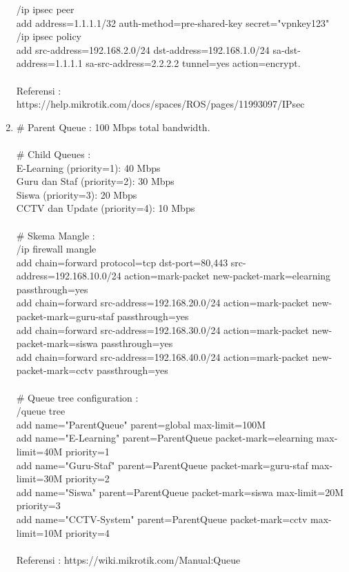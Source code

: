 \begin{enumerate}
	/ip ipsec peer \\
	add address=1.1.1.1/32 auth-method=pre-shared-key secret="vpnkey123" \\
	/ip ipsec policy \\
	add src-address=192.168.2.0/24 dst-address=192.168.1.0/24 sa-dst-address=1.1.1.1 sa-src-address=2.2.2.2 tunnel=yes action=encrypt. \\ \\
	Referensi : https://help.mikrotik.com/docs/spaces/ROS/pages/11993097/IPsec 
	\item \# Parent Queue : 100 Mbps total bandwidth.\\ \\
	\# Child Queues : \\
	E-Learning (priority=1): 40 Mbps \\
	Guru dan Staf (priority=2): 30 Mbps \\ 
	Siswa (priority=3): 20 Mbps \\
	CCTV dan Update (priority=4): 10 Mbps \\ \\
	\# Skema Mangle : \\
	/ip firewall mangle\\
	add chain=forward protocol=tcp dst-port=80,443 src-address=192.168.10.0/24 action=mark-packet new-packet-mark=elearning passthrough=yes \\
	add chain=forward src-address=192.168.20.0/24 action=mark-packet new-packet-mark=guru-staf passthrough=yes \\
	add chain=forward src-address=192.168.30.0/24 action=mark-packet new-packet-mark=siswa passthrough=yes \\
	add chain=forward src-address=192.168.40.0/24 action=mark-packet new-packet-mark=cctv passthrough=yes \\ \\
	\# Queue tree configuration : \\
	/queue tree \\
	add name="ParentQueue" parent=global max-limit=100M \\
	add name="E-Learning" parent=ParentQueue packet-mark=elearning max-limit=40M priority=1 \\
	add name="Guru-Staf" parent=ParentQueue packet-mark=guru-staf max-limit=30M priority=2 \\
	add name="Siswa" parent=ParentQueue packet-mark=siswa max-limit=20M priority=3 \\
	add name="CCTV-System" parent=ParentQueue packet-mark=cctv max-limit=10M priority=4 \\ \\
	Referensi : https://wiki.mikrotik.com/Manual:Queue
\end{enumerate}